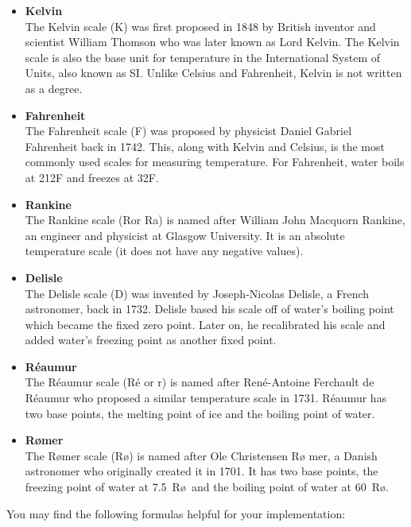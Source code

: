 \documentclass{article}
\begin{document}
\begin{itemize}
\item{\textbf{Kelvin}} \\
The Kelvin scale (K) was first proposed in 1848 by British inventor
and scientist William Thomson who was later known as Lord Kelvin.
The Kelvin scale is also the base unit for temperature in the
International System of Units, also known as SI. Unlike Celsius and
Fahrenheit, Kelvin is not written as a degree.

\item{\textbf{Fahrenheit}} \\
The Fahrenheit scale (F\degree) was proposed by physicist
Daniel Gabriel Fahrenheit back in 1742. This, along with
Kelvin and Celsius, is the most commonly used scales for
measuring temperature. For Fahrenheit, water boils at
212\degree F and freezes at 32\degree F.

\item{\textbf{Rankine}} \\
The Rankine scale (R\degree or Ra\degree) is named after William
John Macquorn Rankine, an engineer and physicist at Glasgow University.
It is an absolute temperature scale (it does not have any negative
values).

\item{\textbf{Delisle}} \\
The Delisle scale (D\degree) was invented by Joseph-Nicolas Delisle,
a French astronomer, back in 1732. Delisle based his scale off of
water's boiling point which became the fixed zero point. Later on,
he recalibrated his scale and added water's freezing point as another
fixed point.

\item{\textbf{R\'eaumur}} \\
The R\'eaumur scale (R\'e or r) is named after Ren\'e-Antoine
Ferchault de R\'eaumur who proposed a similar temperature scale in
1731. R\'eaumur has two base points, the melting point of ice and
the boiling point of water.

\item{\textbf{R\o mer}} \\
The R\o mer scale (R\o \degree) is named after Ole Christensen R\o
mer, a Danish astronomer who originally created it in 1701. It has
two base points, the freezing point of water at 7.5\degree\ R\o\
and the boiling point of water at 60\degree\ R\o.

\end{itemize}

You may find the following formulas helpful for your implementation:
\end{document}
